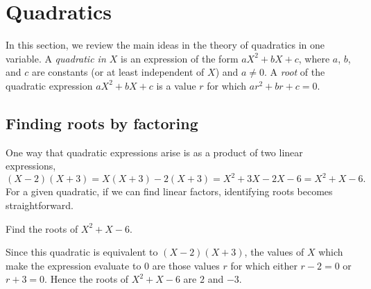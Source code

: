 \section{Quadratics}

In this section, we review the main ideas in the theory of quadratics in one variable. A \emph{quadratic in $X$} is an expression of the form $aX^2 + bX + c$, where $a$, $b$, and $c$ are constants (or at least independent of $X$) and $a\neq 0$. A \emph{root} of the quadratic expression $aX^2 + bX + c$ is a value $r$ for which $ar^2 + br + c = 0$.

\subsection{Finding roots by factoring}

One way that quadratic expressions arise is as a product of two linear expressions,
\begin{equation*}
(X - 2)(X + 3) = X(X + 3) - 2(X + 3) = X^2 + 3X - 2X - 6 = X^2 + X - 6. 
\end{equation*}
For a given quadratic, if we can find linear factors, identifying roots becomes straightforward.

\begin{example}
Find the roots of $X^2 + X - 6$. 
\end{example}
\begin{solution}
Since this quadratic is equivalent to $(X - 2)(X + 3)$, the values of $X$ which make the expression evaluate to $0$ are those values $r$ for which either $r - 2 = 0$ or $r + 3 = 0$. Hence the roots of $X^2 + X - 6$ are $2$ and $-3$.
\end{solution}